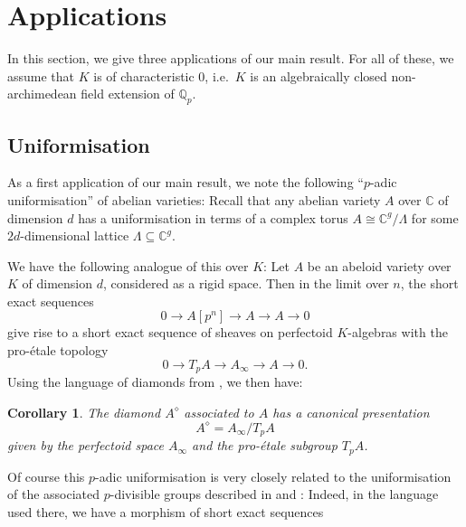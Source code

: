 \documentclass[10pt,oneside]{amsart}
\newtheorem{corollary}[theorem]{Corollary}
\theoremstyle{definition}
\newcommand{\Q}{\mathbb{Q}}
\begin{document}
	
 
	\section{Applications}
	In this section, we give three applications of our main result. For all of these, we assume that $K$ is of characteristic $0$, i.e.\ $K$ is an algebraically closed non-archimedean field extension of $\Q_p$.
	\subsection{Uniformisation}
	As a first application of our main result, we note the following ``$p$-adic uniformisation'' of abelian varieties:
	Recall that any abelian variety $A$ over $\mathbb C$ of dimension $d$ has a uniformisation in terms of a complex torus $A\cong \mathbb C^g/\Lambda$ for some $2d$-dimensional lattice $\Lambda\subseteq \mathbb C^g$.
	
	We have the following analogue of this over $K$: Let $A$ be an abeloid variety over $K$ of dimension $d$, considered as a rigid space. Then in the limit over $n$, the short exact sequences
	\[ 0\to A[p^n]\to A\to A\to 0\]
	give rise to a short exact sequence of sheaves on perfectoid $K$-algebras with the pro-\'etale topology
	\[0\to T_pA \to A_\infty \to A\to 0.\]
	Using the language of diamonds from \cite{etale_cohomology_of_diamonds}, we then have:
	\begin{corollary}
		The diamond $A^{\diamond}$ associated to $A$ has a canonical presentation
		\[A^{\diamond} = A_\infty/T_pA \]
		given by the perfectoid space $A_\infty$ and the pro-\'etale subgroup $T_pA$.
	\end{corollary}
	Of course this $p$-adic uniformisation is very closely related to the uniformisation of the associated $p$-divisible groups described in \cite{SW} and \cite[\S4]{survey}: Indeed, in the language used there, we have a morphism of short exact sequences
	
	\begin{center}
	\end{center}
\end{document}
